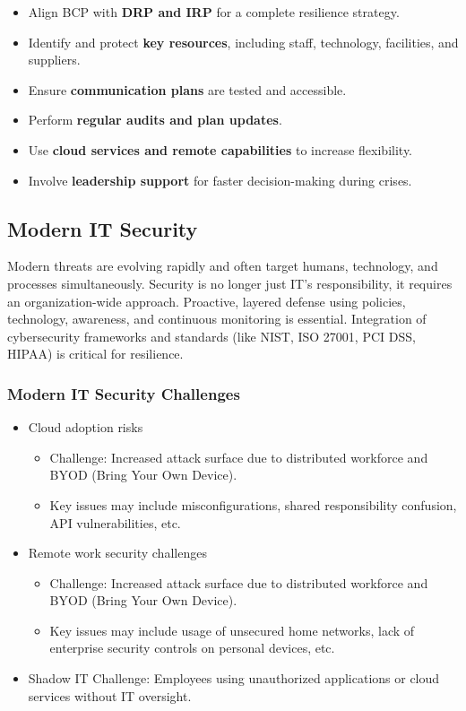 \begin{itemize}
    \item Align BCP with \textbf{DRP and IRP} for a complete resilience strategy.
    \item Identify and protect \textbf{key resources}, including staff, technology, facilities, and suppliers.
    \item Ensure \textbf{communication plans} are tested and accessible.
    \item Perform \textbf{regular audits and plan updates}.
    \item Use \textbf{cloud services and remote capabilities} to increase flexibility.
    \item Involve \textbf{leadership support} for faster decision-making during crises.
\end{itemize}

\subsection{Modern IT Security}

\indent 

Modern threats are evolving rapidly and often target humans, technology, and processes simultaneously. Security is no longer just IT’s responsibility, it requires an organization-wide approach. Proactive, layered defense using policies, technology, awareness, and continuous monitoring is essential. Integration of cybersecurity frameworks and standards (like NIST, ISO 27001, PCI DSS, HIPAA) is critical for resilience.

\subsubsection{Modern IT Security Challenges}

\begin{itemize}
    \item Cloud adoption risks
        \begin{itemize}
            \item Challenge: Increased attack surface due to distributed workforce and BYOD (Bring Your Own Device).
            \item Key issues may include misconfigurations, shared responsibility confusion, API vulnerabilities, etc.
        \end{itemize}
    \item Remote work security challenges
        \begin{itemize}
            \item Challenge: Increased attack surface due to distributed workforce and BYOD (Bring Your Own Device).
            \item Key issues may include usage of unsecured home networks, lack of enterprise security controls on personal devices, etc.
        \end{itemize}
    \item Shadow IT Challenge: Employees using unauthorized applications or cloud services without IT oversight.
\end{itemize}

